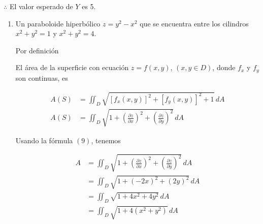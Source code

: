 \documentclass[12pt]{exam}
\begin{document}
\begin{questions}
\begin{enumerate}[a)]
\begin{enumerate}[c.a)]
      $\therefore$ El valor esperado de $Y$ es 5.
    \end{enumerate}


    \begin{enumerate}
    \item Un paraboloide hiperbólico $z=y^2-x^2$ que se encuentra entre los cilindros $x^2+y^2=1$ y $x^2+y^2=4$.

      Por definición

      \begin{tcolorbox}[colback=white,colframe=blue!40!black,title=\textbf{Área superficial}]
        El área de la superficie con ecuación $z=f(x,y)$, $(x,y\in D)$, donde $f_x$ y $f_y$ son continuas, es

        \begin{equation}
          \begin{split}
            A(S)&=\iint_D \sqrt{[f_x(x,y)]^2+[f_y(x,y)]^2+1}\,dA \\
            A(S)&=\iint_D \sqrt{1+\left(\frac{\partial z}{\partial x}\right)^2+\left(\frac{\partial z}{\partial y}\right)^2}\,dA
          \end{split}
        \end{equation}
      \end{tcolorbox}

      Usando la fórmula $(9)$, tenemos

      \begin{align*}
        A
        &=\iint_D \sqrt{1+\left(\frac{\partial z}{\partial x}\right)^2+\left(\frac{\partial z}{\partial y}\right)^2}\,dA \\
        &= \iint_D \sqrt{1+\left(-2x\right)^2+\left(2y\right)^2}\,dA\\
        &= \iint_D \sqrt{1+4x^2+4y^2} \,dA\\
        &= \iint_D \sqrt{1+4(x^2+y^2)} \,dA
      \end{align*}

      \begin{figure}[H]
        \centering
\end{figure}
\end{enumerate}
\end{enumerate}
\end{questions}
\end{document}
